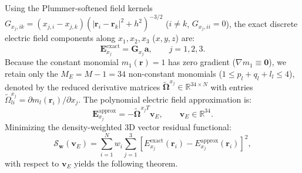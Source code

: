 \documentclass[11pt,a4paper]{article}
\newcommand{\bOmega}{\mathbf{\Omega}}
\begin{document}
Using the Plummer-softened field kernels $G_{x_j, ik} = (x_{j,i} - x_{j,k})(|\bm{r}_i - \bm{r}_k|^2 + h^2)^{-3/2}$ ($i \ne k$, $G_{x_j,ii} = 0$), the exact discrete electric field components along $x_1, x_2, x_3$ ($x, y, z$) are:
\begin{equation}
    \bm{E}_{x_j}^{\mathrm{exact}} = \bm{G}_{x_j} \bm{a}, \qquad j = 1, 2, 3.
    \label{eq:field_exact}
\end{equation}
Because the constant monomial $m_1(\bm{r}) = 1$ has zero gradient ($\nabla m_1 \equiv \bm{0}$), we retain only the $M_E = M - 1 = 34$ non-constant monomials ($1 \le p_l + q_l + l_l \le 4$), denoted by the reduced derivative matrices $\tilde{\bOmega}^{x_j} \in \mathbb{R}^{34 \times N}$ with entries $\tilde{\Omega}_{li}^{x_j} = \partial m_l(\bm{r}_i) / \partial x_j$. The polynomial electric field approximation is:
\begin{equation}
    \bm{E}_{x_j}^{\mathrm{approx}} = -\tilde{\bOmega}^{x_j T} \bm{v}_E, \qquad \bm{v}_E \in \mathbb{R}^{34}.
    \label{eq:field_approx}
\end{equation}
Minimizing the density-weighted 3D vector residual functional:
\begin{equation}
    \mathcal{S}_{\bm{w}}(\bm{v}_E) = \sum_{i=1}^N w_i \sum_{j=1}^3 \left[ E_{x_j}^{\mathrm{exact}}(\bm{r}_i) - E_{x_j}^{\mathrm{approx}}(\bm{r}_i) \right]^2,
    \label{eq:field_lsq}
\end{equation}
with respect to $\bm{v}_E$ yields the following theorem.
\end{document}
